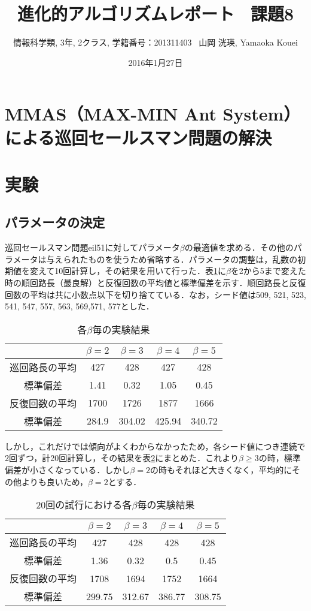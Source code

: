 \documentclass[a4j]{jarticle}
\title{進化的アルゴリズムレポート \ 課題8}
\author{情報科学類, 3年, 2クラス, 学籍番号：201311403 \ 山岡 洸瑛, Yamaoka
Kouei}
\date{2016年1月27日}
\begin{document}
\maketitle

\section*{MMAS（MAX-MIN Ant System）による巡回セールスマン問題の解決}
\section*{実験}
\subsection*{パラメータの決定}
巡回セールスマン問題eil51に対してパラメータ$\beta$の最適値を求める．その他のパラメータは与えられたものを使うため省略する．パラメータの調整は，乱数の初期値を変えて10回計算し，その結果を用いて行った．表\ref{beta}に$\beta$を2から5まで変えた時の順回路長（最良解）と反復回数の平均値と標準偏差を示す．順回路長と反復回数の平均は共に小数点以下を切り捨てている．なお，シード値は{509, 521, 523, 541, 547, 557, 563, 569,571, 577}とした．
\begin{table}[H]
 \begin{center}
  \label{beta}
  \caption{各$\beta$毎の実験結果}
  \begin{tabular}[tb]{|c|c|c|c|c|}\hline
 &$ \beta = 2 $&$ \beta = 3 $&$ \beta = 4 $&$ \beta = 5$ \\\hline
巡回路長の平均 & 427 & 428 & 427 & 428 \\\hline
標準偏差 & 1.41 & 0.32 & 1.05 & 0.45 \\\hline
反復回数の平均 & 1700 & 1726 & 1877 & 1666 \\\hline
標準偏差 & 284.9 & 304.02 & 425.94 & 340.72 \\\hline
 \end{tabular}
 \end{center}
\end{table}
\par しかし，これだけでは傾向がよくわからなかったため，各シード値につき連続で2回ずつ，計20回計算し，その結果を表\ref{beta2}にまとめた．これより$\beta \geq 3$の時，標準偏差が小さくなっている．しかし$\beta = 2$の時もそれほど大きくなく，平均的にその他よりも良いため，$\beta = 2$とする．
\begin{table}[H]
 \begin{center}
  \label{beta2}
  \caption{20回の試行における各$\beta$毎の実験結果}
  \begin{tabular}[tb]{|c|c|c|c|c|}\hline
 &$ \beta = 2 $&$ \beta = 3 $&$ \beta = 4 $&$ \beta = 5$ \\\hline
巡回路長の平均 & 427 & 428 & 428 & 428 \\\hline
標準偏差 & 1.36 & 0.32 & 0.5 & 0.45 \\\hline
反復回数の平均 & 1708 & 1694 & 1752 & 1664 \\\hline
標準偏差 & 299.75 & 312.67 & 386.77 & 308.75 \\\hline
 \end{tabular}
 \end{center}
\end{table}
\end{document}
